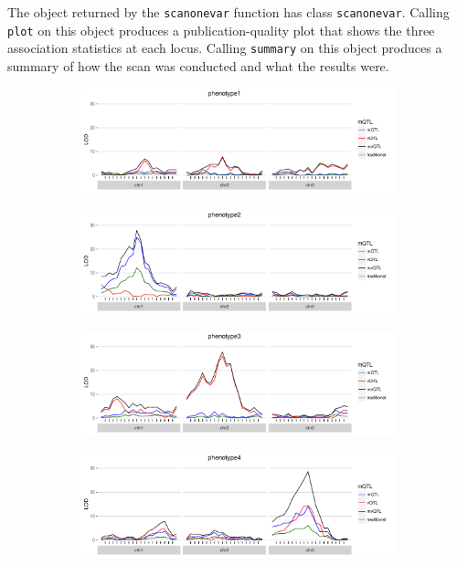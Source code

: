 \documentclass[9pt,twocolumn,twoside]{gsag3jnl}
\begin{document}
The object returned by the \texttt{scanonevar} function has class \texttt{scanonevar}.
Calling \texttt{plot} on this object produces a publication-quality plot that shows the three association statistics at each locus.
Calling \texttt{summary} on this object produces a summary of how the scan was conducted and what the results were.


\begin{figure}
    \begin{subfigure}{0.5\textwidth}
        \includegraphics[width=\textwidth]{images/LOD_scan_phen1.pdf}
    \end{subfigure}

    \begin{subfigure}[b]{0.5\textwidth}
        \includegraphics[width=\textwidth]{images/LOD_scan_phen2.pdf}
    \end{subfigure}

    \begin{subfigure}[b]{0.5\textwidth}
        \includegraphics[width=\textwidth]{images/LOD_scan_phen3.pdf}
    \end{subfigure}
    
    \begin{subfigure}[b]{0.5\textwidth}
        \includegraphics[width=\textwidth]{images/LOD_scan_phen4.pdf}
    \end{subfigure}
    

\end{figure}
\end{document}
